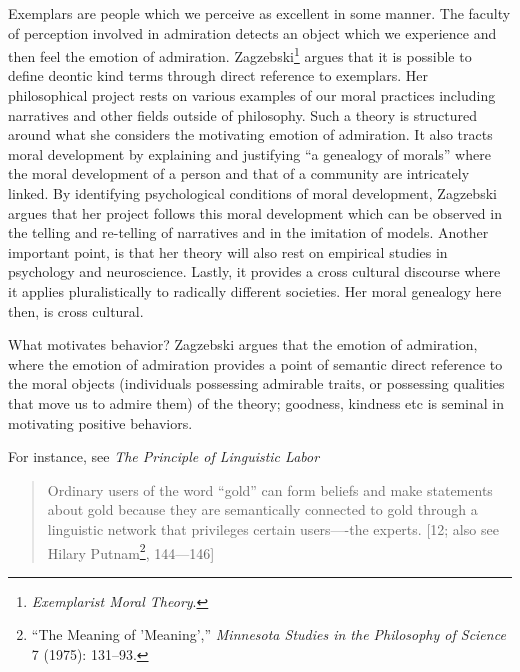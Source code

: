 \documentclass[phdthesis,12pt,final,a4paper]{wuthesis}
\theoremstyle{definition}
\theoremstyle{definition}
\theoremstyle{definition}
\theoremstyle{definition}
\theoremstyle{remark}
\begin{document}
Exemplars are people which we perceive as excellent in some manner. The faculty of perception involved in admiration detects an object which we experience and then feel the emotion of admiration. Zagzebski\footnote{\emph{Exemplarist {Moral Theory}}.} argues that it is possible to define deontic kind terms through direct reference to exemplars. Her philosophical project rests on various examples of our moral practices including narratives and other fields outside of philosophy. Such a theory is structured around what she considers the motivating emotion of admiration. It also tracts moral development by explaining and justifying ``a genealogy of morals'' where the moral development of a person and that of a community are intricately linked. By identifying psychological conditions of moral development, Zagzebski argues that her project follows this moral development which can be observed in the telling and re-telling of narratives and in the imitation of models. Another important point, is that her theory will also rest on empirical studies in psychology and neuroscience. Lastly, it provides a cross cultural discourse where it applies pluralistically to radically different societies. Her moral genealogy here then, is cross cultural.

What motivates behavior? Zagzebski argues that the emotion of admiration, where the emotion of admiration provides a point of semantic direct reference to the moral objects (individuals possessing admirable traits, or possessing qualities that move us to admire them) of the theory; goodness, kindness etc is seminal in motivating positive behaviors.

For instance, see \emph{The Principle of Linguistic Labor}

\begin{quote}
Ordinary users of the word ``gold'' can form beliefs and make statements about gold because they are semantically connected to gold through a linguistic network that privileges certain users----the experts. {[}12; also see Hilary Putnam\footnote{{``The {Meaning} of '{Meaning}',''} \emph{Minnesota Studies in the Philosophy of Science} 7 (1975): 131--93.}, 144---146{]}
\end{quote}
\end{document}
